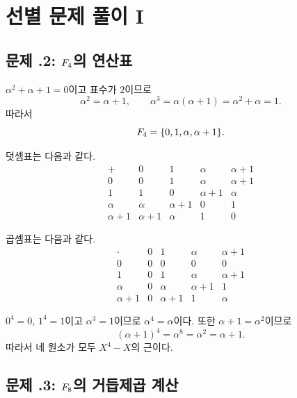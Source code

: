 \section{선별 문제 풀이 I}
\label{sec:finite-field-solutions-a}

\subsection*{문제 \thechapter.2: $F_4$의 연산표}

\begin{solution}
$\alpha^2+\alpha+1=0$이고 표수가 $2$이므로
\[
  \alpha^2=\alpha+1,
  \qquad
  \alpha^3=\alpha(\alpha+1)=\alpha^2+\alpha=1.
\]
따라서
\[
  F_4=\{0,1,\alpha,\alpha+1\}.
\]

덧셈표는 다음과 같다.
\[
\begin{array}{c|cccc}
+&0&1&\alpha&\alpha+1\\
\hline
0&0&1&\alpha&\alpha+1\\
1&1&0&\alpha+1&\alpha\\
\alpha&\alpha&\alpha+1&0&1\\
\alpha+1&\alpha+1&\alpha&1&0
\end{array}
\]

곱셈표는 다음과 같다.
\[
\begin{array}{c|cccc}
\cdot&0&1&\alpha&\alpha+1\\
\hline
0&0&0&0&0\\
1&0&1&\alpha&\alpha+1\\
\alpha&0&\alpha&\alpha+1&1\\
\alpha+1&0&\alpha+1&1&\alpha
\end{array}
\]

$0^4=0$, $1^4=1$이고 $\alpha^3=1$이므로 $\alpha^4=\alpha$이다. 또한 $\alpha+1=\alpha^2$이므로
\[
  (\alpha+1)^4=\alpha^8=\alpha^2=\alpha+1.
\]
따라서 네 원소가 모두 $X^4-X$의 근이다.
\end{solution}

\subsection*{문제 \thechapter.3: $F_8$의 거듭제곱 계산}

